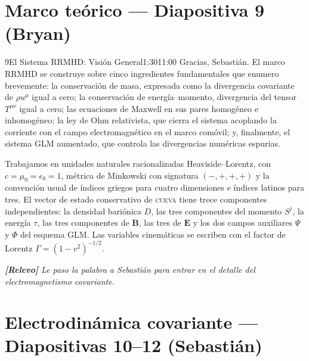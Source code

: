 \documentclass[11pt,a4paper]{article}
\newcommand{\relevo}[1]{%
  \par\medskip
  \noindent\colorbox{tagbg}{\parbox{\dimexpr\linewidth-2\fboxsep\relax}{%
    \small\itshape \textbf{[Relevo]} #1}}\par\medskip}
\begin{document}
\section{Marco teórico --- Diapositiva 9 (Bryan)}

\begin{bryorador}{9}{El Sistema RRMHD: Visión General}{1:30}{11:00}
Gracias, Sebastián. El marco RRMHD se construye sobre cinco ingredientes
fundamentales que enumero brevemente: la conservación de masa, expresada como
la divergencia covariante de $\rho u^\mu$ igual a cero; la conservación de
energía--momento, divergencia del tensor $T^{\mu\nu}$ igual a cero; las
ecuaciones de Maxwell en sus pares homogéneo e inhomogéneo; la ley de Ohm
relativista, que cierra el sistema acoplando la corriente con el campo
electromagnético en el marco comóvil; y, finalmente, el sistema GLM aumentado,
que controla las divergencias numéricas espurias.

Trabajamos en unidades naturales racionalizadas Heaviside--Lorentz, con
$c=\mu_0=\epsilon_0=1$, métrica de Minkowski con signatura
$(-,+,+,+)$ y la convención usual de índices griegos para cuatro dimensiones
e índices latinos para tres. El vector de estado conservativo de
\textsc{cueva} tiene trece componentes independientes: la densidad bariónica
$D$, las tres componentes del momento $S^j$, la energía $\tau$, las tres
componentes de $\mathbf{B}$, las tres de $\mathbf{E}$ y los dos campos
auxiliares $\Psi$ y $\Phi$ del esquema GLM. Las variables cinemáticas se
escriben con el factor de Lorentz $\Gamma=(1-v^2)^{-1/2}$.
\relevo{Le paso la palabra a Sebastián para entrar en el detalle del electromagnetismo covariante.}
\end{bryorador}

\section{Electrodinámica covariante --- Diapositivas 10--12 (Sebastián)}
\end{document}
